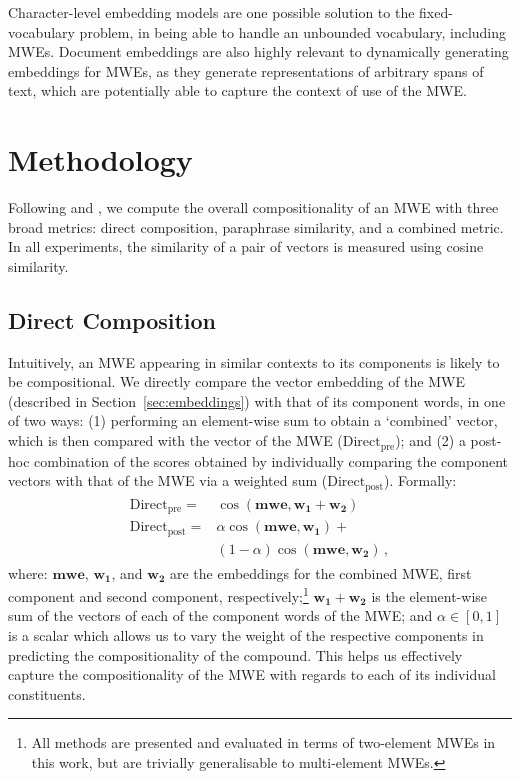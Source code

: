 \documentclass[11pt,a4paper]{article}
\newcommand{\method}[2][]{\ensuremath{\text{#2}_{\text{#1}}}\xspace}
\newcommand{\presum}{\method[pre]{Direct}}
\newcommand{\postsum}{\method[post]{Direct}}
\newcommand{\MWEvec}{\ensuremath{\mathbf{mwe}}\xspace}
\newcommand{\MWEonevec}{\ensuremath{\mathbf{w_1}}\xspace}
\newcommand{\MWEtwovec}{\ensuremath{\mathbf{w_2}}\xspace}
\newcommand{\secref}[2][]{Section#1~\ref{#2}\xspace}
\begin{document}
Character-level embedding models \cite{Hakimi2018} are one possible solution to the fixed-vocabulary problem, in being able to handle an unbounded vocabulary, including MWEs. Document embeddings \cite{Le+:2014,Conneau2017} are also highly relevant to dynamically generating embeddings for MWEs, as they generate representations of arbitrary spans of text, which are potentially able to capture the context of use of the MWE.

\section{Methodology}

Following \citet{Salehi2015} and \citet{Nanda2018}, we compute the overall compositionality of an MWE with three broad metrics: direct composition, paraphrase similarity, and a combined metric. In all experiments, the similarity of a pair of vectors is measured using cosine similarity.

\subsection{Direct Composition}
\label{sec:direct}

Intuitively, an MWE appearing in similar contexts to its components is likely to be compositional. We directly compare the vector embedding of the MWE (described in \secref{sec:embeddings}) with that of its component words, in one of two ways: (1) performing an element-wise sum to obtain a `combined' vector, which is then compared with the vector of the MWE (\presum); and (2) a post-hoc combination of the scores obtained by individually comparing the component vectors with that of the MWE via a weighted sum (\postsum). Formally:
\begin{eqnarray*}
  \begin{split}
    \presum = & \cos(\MWEvec, \MWEonevec + \MWEtwovec)\\
    \postsum = & \alpha \cos(\MWEvec, \MWEonevec) + \\  
    & (1 - \alpha) \cos(\MWEvec, \MWEtwovec)\,,
  \end{split}
\end{eqnarray*}
where: \MWEvec, \MWEonevec, and \MWEtwovec are the embeddings for the combined MWE, first component and second component, respectively;\footnote{All methods are presented and evaluated in terms of two-element MWEs in this work, but are trivially generalisable to multi-element MWEs.} $\MWEonevec + \MWEtwovec$ is the element-wise sum of the vectors of each of the component words of the MWE; and $\alpha \in [0,1]$ is a scalar which allows us to vary the weight of the respective components in predicting the compositionality of the compound. This helps us effectively capture the compositionality of the MWE with regards to each of its individual constituents.
\end{document}
